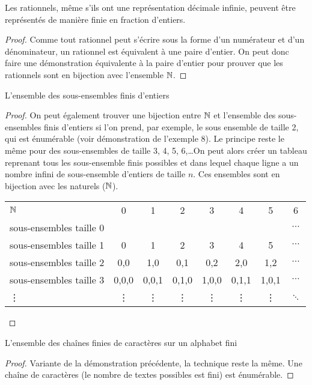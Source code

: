 \begin{myexem}
 Les rationnels, même s'ils ont une représentation décimale infinie, peuvent être représentés de manière finie en fraction d'entiers. 
	 \begin{proof} 
	 	Comme tout rationnel peut s'écrire sous la forme d'un numérateur et d'un dénominateur, un rationnel est équivalent à une paire d'entier. On peut donc faire une démonstration équivalente à la paire d'entier pour prouver que les rationnels sont en bijection avec l'ensemble $\mathbb{N}$. 
	 \end{proof}
 \end{myexem}
  
\begin{myexem}  
  L'ensemble des sous-ensembles finis d'entiers
  \begin{proof}
  On peut également trouver une bijection entre $\mathbb{N}$ et l'ensemble des sous-ensembles finis d'entiers si l'on prend, par exemple, le sous ensemble de taille 2, qui est énumérable (voir démonstration de l'exemple 8). Le principe reste le même pour des sous-ensembles de taille 3, 4, 5, 6,\dots On peut alors créer un tableau reprenant tous les sous-ensemble finis possibles et dans lequel chaque ligne a un nombre infini de sous-ensemble d'entiers de taille $n$. Ces ensembles sont en bijection avec les naturels ($\mathbb{N}$).
  
    \begin{tabular}{ l c c  c  c c c  c }
 	 $\mathbb{N}$ & 0 & 1 & 2  & 3 & 4 & 5 & 6  \\
 	 sous-ensembles  taille 0  & {} & {} & {} & {} & {} & {}  & $\cdots$ \\
 	 sous-ensembles  taille 1  & {0} & {1} & {2} & {3} & {4} & {5} & $\cdots$ \\
 	 sous-ensembles  taille 2  & {0,0} & {1,0} & {0,1} & {0,2} & {2,0} & {1,2}  & $\cdots$ \\
 	 sous-ensembles  taille 3  & {0,0,0} & {0,0,1} & {0,1,0} & {1,0,0} & {0,1,1} & {1,0,1}  & $\cdots$ \\
 	 \vdots  & {\vdots} & {\vdots} & {\vdots} & {\vdots} & {\vdots} & {\vdots}  & $\ddots$ \\
	\end{tabular}
  \end{proof}
\end{myexem}

\begin{myexem}  
  L'ensemble des chaînes finies de caractères sur un alphabet fini
\begin{proof}
 Variante de la démonstration précédente, la technique reste la même. Une chaîne de caractères (le nombre de textes possibles est fini) est énumérable.  
\end{proof}
\end{myexem}

